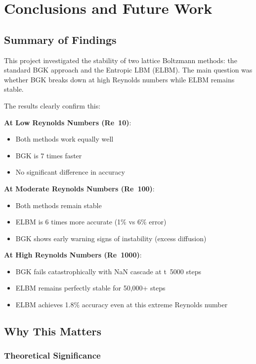 \chapter{Conclusions and Future Work}

\section{Summary of Findings}

This project investigated the stability of two lattice Boltzmann methods: the standard BGK approach and the Entropic LBM (ELBM). The main question was whether BGK breaks down at high Reynolds numbers while ELBM remains stable.

The results clearly confirm this:

\textbf{At Low Reynolds Numbers (Re~10)}:
\begin{itemize}
    \item Both methods work equally well
    \item BGK is 7 times faster
    \item No significant difference in accuracy
\end{itemize}

\textbf{At Moderate Reynolds Numbers (Re~100)}:
\begin{itemize}
    \item Both methods remain stable
    \item ELBM is 6 times more accurate (1\% vs 6\% error)
    \item BGK shows early warning signs of instability (excess diffusion)
\end{itemize}

\textbf{At High Reynolds Numbers (Re~1000)}:
\begin{itemize}
    \item BGK fails catastrophically with NaN cascade at t~5000 steps
    \item ELBM remains perfectly stable for 50,000+ steps
    \item ELBM achieves 1.8\% accuracy even at this extreme Reynolds number
\end{itemize}

\section{Why This Matters}

\subsection{Theoretical Significance}

